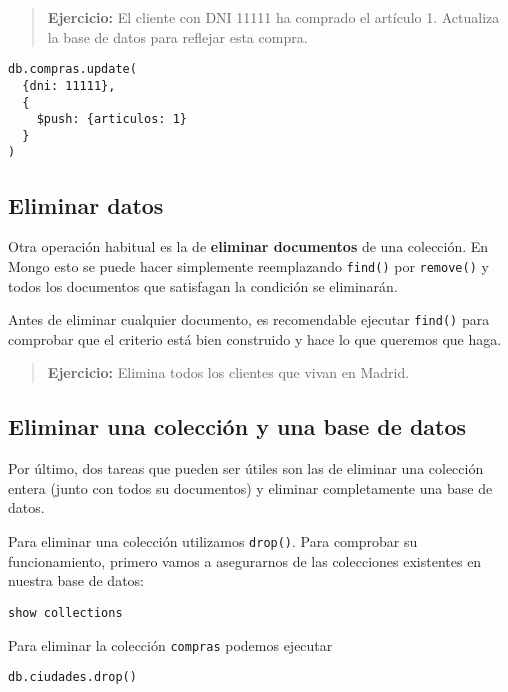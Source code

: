 \documentclass[]{article}
\begin{document}
\begin{quote}
\textbf{Ejercicio:} El cliente con DNI 11111 ha comprado el artículo 1.
Actualiza la base de datos para reflejar esta compra.
\end{quote}

\begin{verbatim}
db.compras.update(
  {dni: 11111},
  {
    $push: {articulos: 1}
  }
)
\end{verbatim}

\hypertarget{eliminar-datos}{%
\subsection{Eliminar datos}\label{eliminar-datos}}

Otra operación habitual es la de \textbf{eliminar documentos} de una
colección. En Mongo esto se puede hacer simplemente reemplazando
\texttt{find()} por \texttt{remove()} y todos los documentos que
satisfagan la condición se eliminarán.

Antes de eliminar cualquier documento, es recomendable ejecutar
\texttt{find()} para comprobar que el criterio está bien construido y
hace lo que queremos que haga.

\begin{quote}
\textbf{Ejercicio:} Elimina todos los clientes que vivan en Madrid.
\end{quote}

\hypertarget{eliminar-una-coleccion-y-una-base-de-datos}{%
\subsection{Eliminar una colección y una base de
datos}\label{eliminar-una-coleccion-y-una-base-de-datos}}

Por último, dos tareas que pueden ser útiles son las de eliminar una
colección entera (junto con todos su documentos) y eliminar
completamente una base de datos.

Para eliminar una colección utilizamos \texttt{drop()}. Para comprobar
su funcionamiento, primero vamos a asegurarnos de las colecciones
existentes en nuestra base de datos:

\begin{verbatim}
show collections
\end{verbatim}

Para eliminar la colección \texttt{compras} podemos ejecutar

\begin{verbatim}
db.ciudades.drop()
\end{verbatim}
\end{document}
